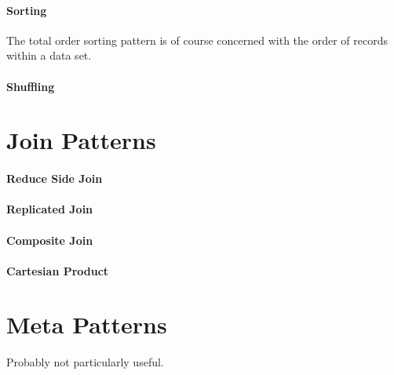 \paragraph{Sorting}
The total order sorting pattern is of course concerned with the order of records within a data set. 

\paragraph{Shuffling}


\section{Join Patterns}
\label{sec:joins}

\paragraph{Reduce Side Join}

\paragraph{Replicated Join}

\paragraph{Composite Join}

\paragraph{Cartesian Product}

\section{Meta Patterns}
\label{sec:metapatterns}
Probably not particularly useful.

